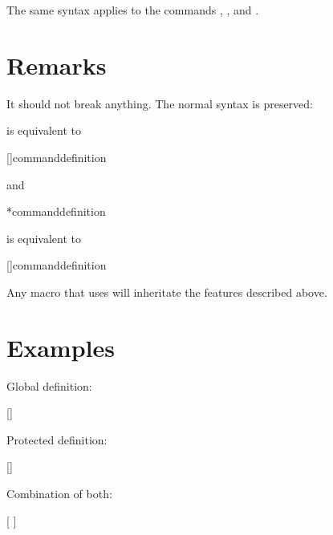 \documentclass{article}
\begin{document}
The same syntax applies to the commands ,
,  and
.

\section{Remarks}

It should not break anything.  The normal syntax is preserved:
%
\begin{texcode}
\end{texcode}
%
is equivalent to
%
\begin{texcode}
[]{\<command\>}{\<definition\>}
\end{texcode}
%
and
%
\begin{texcode}
*{command}{definition}
\end{texcode}
%
is equivalent to
%
\begin{texcode}
[]{\<command\>}{\<definition\>}
\end{texcode}
%
Any macro that uses  will inheritate the features
described above.

\section{Examples}

Global definition:
%
\begin{texcode}
[]
\end{texcode}
%
Protected definition:
%
\begin{texcode}
[]
\end{texcode}
%
Combination of both:
%
\begin{texcode}
[ ]
\end{texcode}
\end{document}
